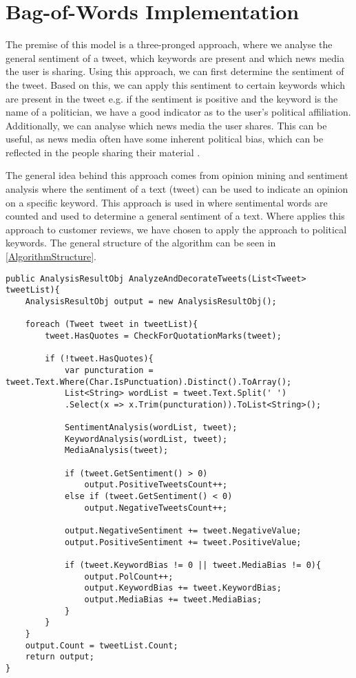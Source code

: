 \section{Bag-of-Words Implementation}\label{sec:BoW}
The premise of this model is a three-pronged approach, where we
analyse the general sentiment of a tweet, which keywords are present and which
news media the user is sharing. Using this approach, we can first determine the
sentiment of the tweet. Based on this, we can apply this sentiment to certain
keywords which are present in the tweet e.g. if the sentiment is positive and
the keyword is the name of a politician, we have a good indicator as to the
user's political affiliation. Additionally, we can analyse which news media the
user shares. This can be useful, as news media often have some inherent
political bias, which can be reflected in the people sharing their material
\citep{allSidesBias}.\nl

The general idea behind this approach comes from opinion mining and sentiment
analysis where the sentiment of a text (tweet) can be used to indicate an
opinion on a specific keyword. This approach is used in
 where sentimental words are counted and used to
determine a general sentiment of a text. Where  applies
this approach to customer reviews, we have chosen to apply the approach to
political keywords. The general structure of the algorithm can be seen in
\autoref{AlgorithmStructure}.\\


\begin{minipage}[H]{\linewidth}
\begin{lstlisting}[caption = Main method for handling the algorithm, label = AlgorithmStructure]
public AnalysisResultObj AnalyzeAndDecorateTweets(List<Tweet> tweetList){
	AnalysisResultObj output = new AnalysisResultObj();

	foreach (Tweet tweet in tweetList){
    	tweet.HasQuotes = CheckForQuotationMarks(tweet);

		if (!tweet.HasQuotes){
        	var puncturation = tweet.Text.Where(Char.IsPunctuation).Distinct().ToArray(); 
        	List<String> wordList = tweet.Text.Split(' ')
        	.Select(x => x.Trim(puncturation)).ToList<String>();

            SentimentAnalysis(wordList, tweet);
            KeywordAnalysis(wordList, tweet);
            MediaAnalysis(tweet);

            if (tweet.GetSentiment() > 0)
            	output.PositiveTweetsCount++;
            else if (tweet.GetSentiment() < 0)
            	output.NegativeTweetsCount++;

            output.NegativeSentiment += tweet.NegativeValue;
            output.PositiveSentiment += tweet.PositiveValue;

            if (tweet.KeywordBias != 0 || tweet.MediaBias != 0){
            	output.PolCount++;
                output.KeywordBias += tweet.KeywordBias;
                output.MediaBias += tweet.MediaBias;    
            }
		}
	}
    output.Count = tweetList.Count;
    return output;
}
\end{lstlisting}
\end{minipage}

